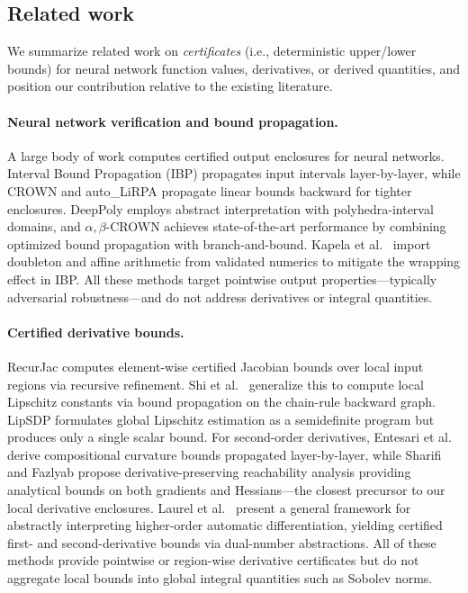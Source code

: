 \documentclass[a4paper, 11pt]{article}
\begin{document}
	
	\subsection{Related work}

    We summarize related work on \emph{certificates} (i.e., deterministic upper/lower bounds) for neural network function values, derivatives, or derived quantities, and position our contribution relative to the existing literature.

    \paragraph{Neural network verification and bound propagation.}
A large body of work computes certified output enclosures for neural networks.
Interval Bound Propagation (IBP) \cite{Gowal2018,Mirman2018} propagates input
intervals layer-by-layer, while CROWN and auto\_LiRPA \cite{Zhang2018,Xu2020}
propagate linear bounds backward for tighter enclosures. DeepPoly
\cite{Singh2019} employs abstract interpretation with polyhedra-interval
domains, and $\alpha,\beta$-CROWN \cite{Wang2021} achieves state-of-the-art
performance by combining optimized bound propagation with branch-and-bound.
Kapela et al.\ \cite{Kapela2024} import doubleton and affine arithmetic from
validated numerics to mitigate the wrapping effect in IBP. All these methods
target pointwise output properties---typically adversarial robustness---and do
not address derivatives or integral quantities.
 
\paragraph{Certified derivative bounds.}
RecurJac \cite{Zhang2019RecurJac} computes element-wise certified Jacobian bounds
over local input regions via recursive refinement. Shi et al.\ \cite{Shi2022}
generalize this to compute local Lipschitz constants via bound propagation on the
chain-rule backward graph. LipSDP \cite{Fazlyab2019} formulates global Lipschitz
estimation as a semidefinite program but produces only a single scalar bound. For
second-order derivatives, Entesari et al.\ \cite{Entesari2024} derive
compositional curvature bounds propagated layer-by-layer, while Sharifi and
Fazlyab \cite{Sharifi2024} propose derivative-preserving reachability analysis
providing analytical bounds on both gradients and Hessians---the closest precursor
to our local derivative enclosures. Laurel et al.\ \cite{Laurel2022} present a
general framework for abstractly interpreting higher-order automatic
differentiation, yielding certified first- and second-derivative bounds via
dual-number abstractions. All of these methods provide pointwise or region-wise
derivative certificates but do not aggregate local bounds into global integral
quantities such as Sobolev norms.
 
\end{document}
